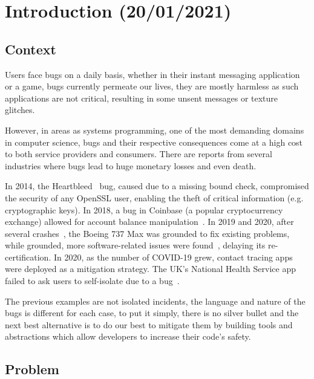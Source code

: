 \chapter{Introduction (20/01/2021)}\label{cha:introduction}

\section{Context}\label{sec:context}


Users face bugs on a daily basis, whether in their instant messaging application or a game,
bugs currently permeate our lives, they are mostly harmless as such applications are not critical,
resulting in some unsent messages or texture glitches.

However, in areas as systems programming, one of the most demanding domains in computer science,
bugs and their respective consequences come at a high cost to both service providers and consumers.
There are reports from several industries where bugs lead to huge monetary losses and even death.

In 2014, the Heartbleed~\autocite{Heartbleed} bug, caused due to a missing bound check,
compromised the security of any OpenSSL user, enabling the theft of critical information (e.g. cryptographic keys).
In 2018, a bug in Coinbase (a popular cryptocurrency exchange)
allowed for account balance manipulation~\autocite{Vicompany2018}.
In 2019 and 2020, after several crashes~\autocite{Campbell2019},
the Boeing 737 Max was grounded to fix existing problems, while grounded,
more software-related issues were
found~\autocite{Okane2019,Okane2020},
delaying its re-certification.
In 2020, as the number of COVID-19 grew,
contact tracing apps were deployed as a mitigation strategy.
The UK's National Health Service app failed to ask users to self-isolate due to a
bug~\autocite{Mageit2020}.

The previous examples are not isolated incidents, the language and nature of the bugs is different for each case,
to put it simply, there is no silver bullet and the next best alternative is to do our best to mitigate them by
building tools and abstractions which allow developers to increase their code's safety.

\section{Problem}\label{sec:problem}

